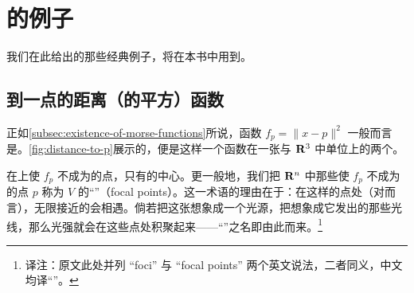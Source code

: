 \section{\trMorseFunction{}的例子}
\label{sec:examples-of-morse-functions}

我们在此给出的那些经典\trMorseFunction{}例子，将在本书中用到。

\subsection{到一点的距离（的平方）函数}
\label{subsec:distance-to-a-point}

正如\cref{subsec:existence-of-morse-functions}所说，函数 $f_p=\|x-p\|^2$ 一般而言是\trMorseFunction。\cref{fig:distance-to-p}展示的，便是这样一个函数在一张\trTorus{}与 $\mathbf{R}^3$ 中单位\trSphere{}上的两个\trCriticalPoint。

\begin{remark}\label{thm:focal-points-definition}
在\trSphere{}上使 $f_p$ 不成为\trMorseFunction{}的点，只有\trSphere{}的中心。更一般地，我们把 $\mathbf{R}^n$ 中那些使 $f_p$ 不成为\trMorseFunction{}的点 $p$ 称为 $V$ 的“\textbf{\trFocalPoint}”（focal points）。这一术语的理由在于：在这样的点处（对\trHypersurface{}而言），无限接近的\trNormalVector{}会相遇。倘若把这张\trHypersurface{}想象成一个光源，把\trNormalVector{}想象成它发出的那些光线，那么光强就会在这些点处积聚起来——“\trFocalPoint”之名即由此而来。\footnote{译注：原文此处并列 “foci” 与 “focal points” 两个英文说法，二者同义，中文均译“\trFocalPoint”。}
\end{remark}

